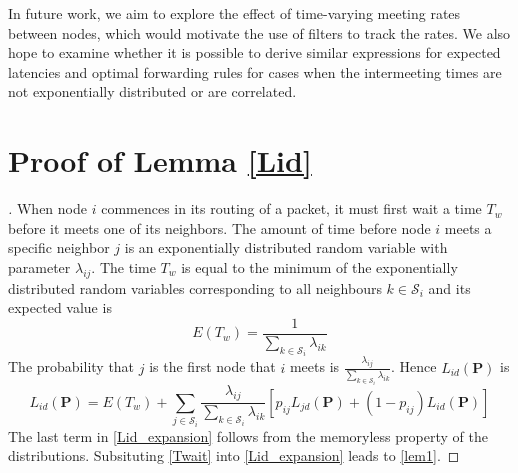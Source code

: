 \documentclass[journal,onecolumn,11pt]{IEEEtran}
\theoremstyle{plain}
\theoremstyle{definition}
\def\bP{{\mathbf P}}
\begin{document}
In future work, we aim to explore the effect of time-varying meeting
rates between nodes, which would motivate the use of filters to track
the rates. We also hope to examine whether it is possible to derive
similar expressions for expected latencies and optimal forwarding
rules for cases when the intermeeting times are not exponentially
distributed or are correlated.

 \appendices
\section{Proof of Lemma \ref{Lid}}\label{pl1}
\begin{proof}[\unskip\nopunct]When node $i$ commences in its routing of a packet, it must
  first wait a time $T_{w}$ before it meets one of its neighbors. The amount of time before node $i$ meets a specific neighbor
  $j$ is an exponentially distributed random variable with
  parameter $\lambda_{ij}$. The time $T_{w}$ is equal to
  the minimum of the exponentially distributed random variables
  corresponding to all neighbours $k \in \mathcal{S}_i$
  and its expected value is
\begin{equation}\label{Twait}
E(T_{w})=\frac{1}{\sum\limits_{k \in \mathcal{S}_i} \lambda_{ik}}
\end{equation}
The probability that $j$ is the first node that $i$
meets is $\frac{\lambda_{ij}}{\sum_{k \in \mathcal{S}_i}
  \lambda_{ik}}$. Hence $L_{id}(\bP)$ is
\begin{equation} \label{Lid_expansion} L_{id}(\bP)=E(T_{w})+\sum_{j
    \in \mathcal{S}_i}\frac{\lambda_{ij}}{\sum\limits_{k \in \mathcal{S}_i}
    \lambda_{ik}} [ p_{ij}L_{jd}(\bP)+(1-p_{ij})L_{id}(\bP)]
\end{equation}
The last term in \eqref{Lid_expansion} follows from the
memoryless property of the distributions. Subsituting \eqref{Twait} into
\eqref{Lid_expansion} leads to
\eqref{lem1}.
\end{proof}
\end{document}
